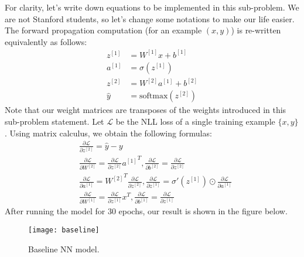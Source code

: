 \begin{answer}
For clarity, let's write down equations to be implemented in this sub-problem. We are not Stanford students, so let's change some notations to make our life easier. The forward propagation computation (for an example $(x,y)$) is re-written equivalently as follows:
\begin{align}
	z^{[1]} &= W^{[1]}x + b^{[1]} \\
	a^{[1]} &= \sigma(z^{[1]}) \\
	z^{[2]}  &= W^{[2]} a^{[1]} + b^{[2]} \\
	\hat{y} &= \text{softmax}(z^{[2]})
\end{align}
Note that our weight matrices are transposes of the weights introduced in this sub-problem statement. Let $\mathcal{L}$ be the NLL loss of a single training example $\{x,y\}$. Using matrix calculus, we obtain the following formulas:
\begin{align}
	& \frac{\partial\mathcal{L}}{\partial z^{[2]}} = \hat{y} - y \\
	& \frac{\partial\mathcal{L}}{\partial W^{[2]}} = \frac{\partial\mathcal{L}}{\partial z^{[2]}} {a^{[1]}}^T, \frac{\partial\mathcal{L}}{\partial b^{[2]}} = \frac{\partial\mathcal{L}}{\partial z^{[2]}} \\
	& \frac{\partial\mathcal{L}}{\partial a^{[1]}} = {W^{[2]}}^T \frac{\partial\mathcal{L}}{\partial z^{[2]}}, \frac{\partial\mathcal{L}}{\partial z^{[1]}} = \sigma'(z^{[1]}) \odot \frac{\partial\mathcal{L}}{\partial a^{[1]}} \\
	&\frac{\partial\mathcal{L}}{\partial W^{[1]}} = \frac{\partial\mathcal{L}}{\partial z^{[1]}} x^T, \frac{\partial\mathcal{L}}{\partial b^{[1]}} = \frac{\partial\mathcal{L}}{\partial z^{[1]}}
\end{align}
After running the model for 30 epochs, our result is shown in the figure below.
\begin{figure}[H]
	\centering
	\texttt{[image: baseline]}
	\caption{Baseline NN model.}
\end{figure}
\end{answer}
   
 
 
 
 
 
 
 
 
 
 
 
 
 
 
 
 
 
 
 
 
 
 
 
 
 
